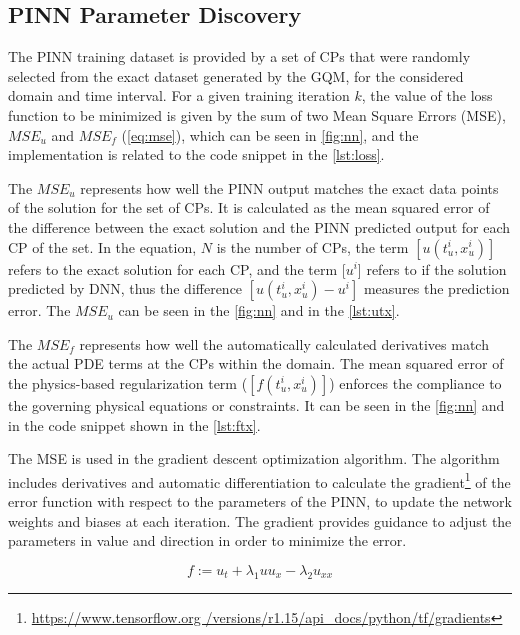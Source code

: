 \subsection{PINN Parameter Discovery}
\label{sec:ppd}

The PINN training dataset is provided by a set of CPs that were randomly selected from the exact dataset generated by the GQM, for the considered domain and time interval. For a given training iteration $k$, the value of the loss function to be minimized is given by the sum of two Mean Square Errors (MSE),
$MSE_u$ and $MSE_f$ (\autoref{eq:mse}), which can be seen in \autoref{fig:nn}, and the implementation is related to the code snippet in the \autoref{lst:loss}.

The $MSE_{u}$ represents how well the PINN output matches the exact data points of the solution for the set of CPs. It is calculated as the mean squared error of the difference between the exact solution and the PINN predicted output for each CP of the set. In the equation, $N$ is the number of CPs, the term $[u(t^i_u, x^i_u)]$ refers to the exact solution for each CP, and the term [$u^i$] refers to if the solution predicted by DNN, thus the difference $[u(t^i_u, x^i_u)-u^i]$ measures the prediction error. The $MSE_{u}$ can be seen in the \autoref{fig:nn} and in the \autoref{lst:utx}.

The $MSE_f$ represents how well the automatically calculated derivatives  match the actual PDE terms at the CPs within the domain. The mean squared error of the physics-based regularization term ($[f(t^i_u, x^i_u)]$) enforces the compliance to the governing physical equations or constraints.
It can be seen in the \autoref{fig:nn} and in the code snippet shown in the \autoref{lst:ftx}.

The MSE is used in the gradient descent optimization algorithm. The algorithm includes derivatives and automatic differentiation \cite{Baydin2018} to calculate the gradient\footnote{\url{https://www.tensorflow.org /versions/r1.15/api_docs/python/tf/gradients}} of the error function with respect to the parameters of the PINN, to update the network weights and biases at each iteration. The gradient provides guidance to adjust the parameters in value and direction in order to minimize the error.

\begin{equation}
f := u_t + \lambda_1 u u_x - \lambda_2 u_{xx}
\label{eq:ftx}
\end{equation}


